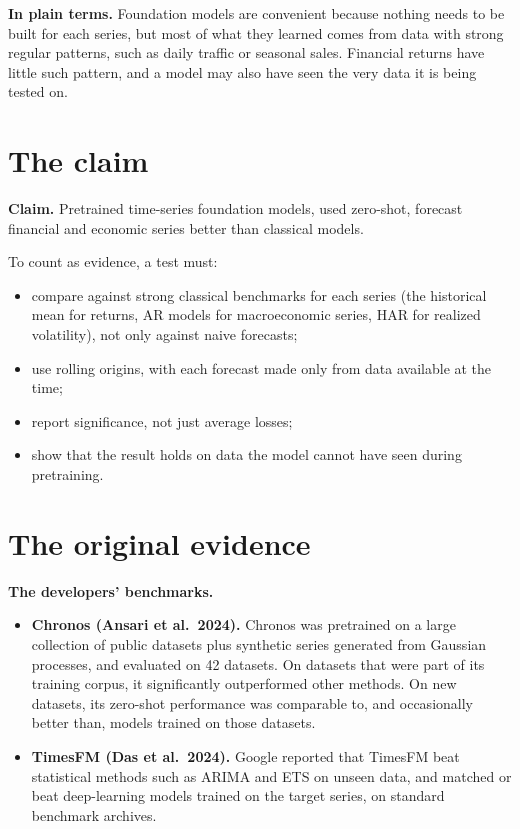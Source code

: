\noindent\textbf{In plain terms.} Foundation models are convenient because nothing needs to be built for each series, but most of what they learned comes from data with strong regular patterns, such as daily traffic or seasonal sales. Financial returns have little such pattern, and a model may also have seen the very data it is being tested on.

\section{The claim}
\label{sec:21-claim}

\begin{callout}
\textbf{Claim.} Pretrained time-series foundation models, used zero-shot, forecast financial and economic series better than classical models.
\end{callout}

To count as evidence, a test must:

\begin{itemize}
  \item compare against strong classical benchmarks for each series (the historical mean for returns, AR models for macroeconomic series, HAR for realized volatility), not only against naive forecasts;
  \item use rolling origins, with each forecast made only from data available at the time;
  \item report significance, not just average losses;
  \item show that the result holds on data the model cannot have seen during pretraining.
\end{itemize}

\section{The original evidence}
\label{sec:21-evidence}

\textbf{The developers' benchmarks.}

\begin{itemize}
  \item \textbf{Chronos (Ansari et al.\ 2024).} Chronos was pretrained on a large collection of public datasets plus synthetic series generated from Gaussian processes, and evaluated on 42 datasets. On datasets that were part of its training corpus, it significantly outperformed other methods. On new datasets, its zero-shot performance was comparable to, and occasionally better than, models trained on those datasets.
  \item \textbf{TimesFM (Das et al.\ 2024).} Google reported that TimesFM beat statistical methods such as ARIMA and ETS on unseen data, and matched or beat deep-learning models trained on the target series, on standard benchmark archives.
\end{itemize}


